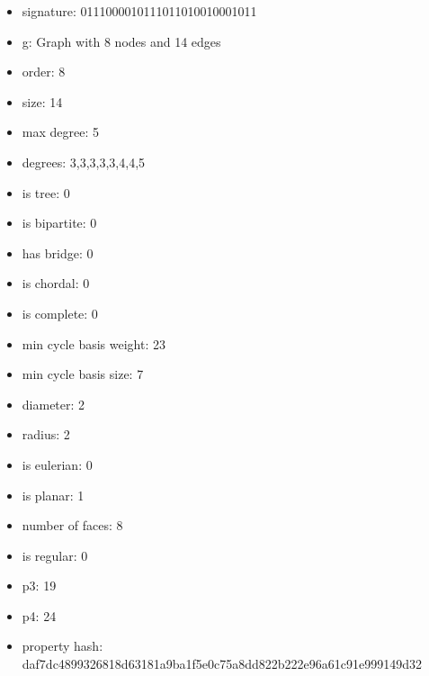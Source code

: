 \begin{itemize}
\item signature: 0111000010111011010010001011
\item g: Graph with 8 nodes and 14 edges
\item order: 8
\item size: 14
\item max degree: 5
\item degrees: 3,3,3,3,3,4,4,5
\item is tree: 0
\item is bipartite: 0
\item has bridge: 0
\item is chordal: 0
\item is complete: 0
\item min cycle basis weight: 23
\item min cycle basis size: 7
\item diameter: 2
\item radius: 2
\item is eulerian: 0
\item is planar: 1
\item number of faces: 8
\item is regular: 0
\item p3: 19
\item p4: 24
\item property hash: daf7dc4899326818d63181a9ba1f5e0c75a8dd822b222e96a61c91e999149d32
\end{itemize}
\newpage
\begin{figure}
\end{figure}
